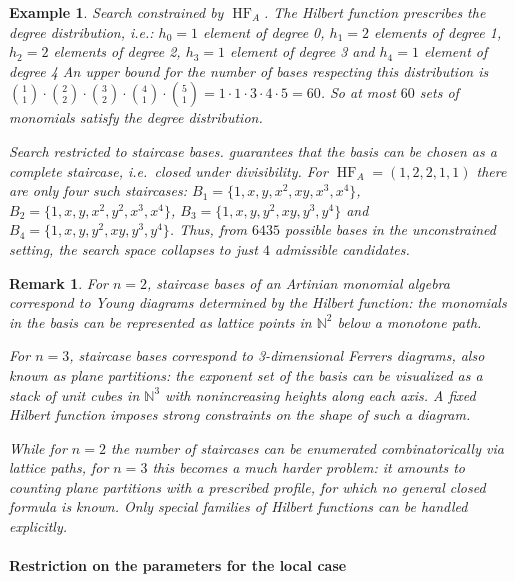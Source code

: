 \documentclass[a4paper,11p]{amsart}
\newtheorem{example0}[defn0]{Example}
\newtheorem{remark0}[defn0]{Remark}
\newenvironment{example}{ \begin{example0}\rm}{\end{example0}}
\newenvironment{remark}{ \begin{remark0}\rm}{\end{remark0}}
\begin{document}
\begin{example}
\sloppy\emph{Search constrained by $\operatorname{HF}_A$.}
The Hilbert function prescribes the degree distribution, i.e.:  $h_0=1$ element of degree 0, $h_1=2$ elements of degree 1,  
 $h_2=2$ elements of degree 2, 
 $h_3=1$ element of degree 3 and $h_4=1$ element of degree 4  
An upper bound for the number of bases respecting this distribution is
$
\binom{1}{1} \cdot \binom{2}{2} \cdot \binom{3}{2} \cdot \binom{4}{1} \cdot \binom{5}{1} 
= 1 \cdot 1 \cdot 3 \cdot 4\cdot 5 = 60$.
So at most $60$ sets of monomials satisfy the degree distribution.

\emph{Search restricted to staircase bases.}
 guarantees that the basis can be chosen as a \emph{complete staircase}, i.e.\ closed under divisibility.  
For $\operatorname{HF}_A=(1,2,2,1,1)$ there are only four such staircases: $
B_1 = \{1, x, y, x^2, xy, x^3, x^4\}$, $ 
B_2 = \{1, x, y, x^2, y^2, x^3, x^4\}$, $ 
B_3 = \{1, x, y, y^2, xy, y^3, y^4\}$ and $ 
B_4 = \{1, x, y, y^2, xy, y^3, y^4 \}$.
Thus, from $6435$ possible bases in the unconstrained setting, the search space collapses to just $4$ admissible candidates.


\end{example}
\begin{remark}
For $n=2$, staircase bases of an Artinian monomial algebra correspond to \emph{Young diagrams} determined by the Hilbert function: the monomials in the basis can be represented as lattice points in $\mathbb{N}^2$ below a monotone path.  

For $n=3$, staircase bases correspond to \emph{3-dimensional Ferrers diagrams}, 
also known as \emph{plane partitions}: the exponent set of the basis can be visualized as a stack of unit cubes in $\mathbb{N}^3$ with nonincreasing heights along each axis.  
A fixed Hilbert function imposes strong constraints on the shape of such a diagram. 

While for $n=2$ the number of staircases can be enumerated combinatorically via lattice paths, for $n=3$ this becomes a much harder problem: it amounts to counting plane partitions with a prescribed profile, for which no general closed formula is known. 
Only special families of Hilbert functions can be handled explicitly.
\end{remark}
\paragraph{\textbf{Restriction on the parameters for the local case}}
\end{document}
